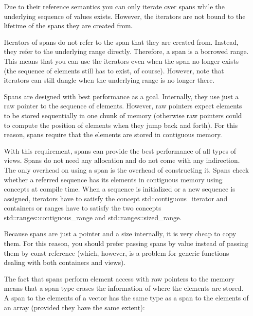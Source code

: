 
Due to their reference semantics you can only iterate over spans while the underlying sequence of values exists. However, the iterators are not bound to the lifetime of the spans they are created from.

Iterators of spans do not refer to the span that they are created from. Instead, they refer to the underlying range directly. Therefore, a span is a borrowed range. This means that you can use the iterators even when the span no longer exists (the sequence of elements still has to exist, of course). However, note that iterators can still dangle when the underlying range is no longer there.


Spans are designed with best performance as a goal. Internally, they use just a raw pointer to the sequence of elements. However, raw pointers expect elements to be stored sequentially in one chunk of memory (otherwise raw pointers could to compute the position of elements when they jump back and forth). For this reason, spans require that the elements are stored in contiguous memory.

With this requirement, spans can provide the best performance of all types of views. Spans do not need any allocation and do not come with any indirection. The only overhead on using a span is the overhead of constructing it. Spans check whether a referred sequence has its elements in contiguous memory using concepts at compile time. When a sequence is initialized or a new sequence is assigned, iterators have to satisfy the concept std::contiguous\_iterator and containers or ranges have to satisfy the two concepts std::ranges::contiguous\_range and std::ranges::sized\_range.

Because spans are just a pointer and a size internally, it is very cheap to copy them. For this reason, you should prefer passing spans by value instead of passing them by const reference (which, however, is a problem for generic functions dealing with both containers and views).


The fact that spans perform element access with raw pointers to the memory means that a span type erases the information of where the elements are stored. A span to the elements of a vector has the same type as a span to the elements of an array (provided they have the same extent):


